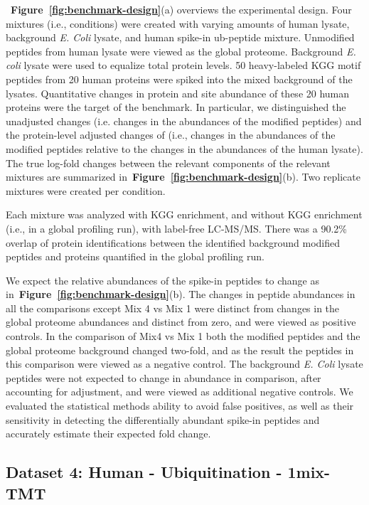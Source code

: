 \documentclass[mcp]{article}
\numberwithin{table}{section}
\def\figref#1{{\bf Figure~\ref{fig:#1}}}
\begin{document}
\medskip {}~\figref{benchmark-design}(a) overviews the experimental design. Four mixtures (i.e., conditions) were created with varying amounts of human lysate, background {\it E. Coli} lysate, and human spike-in ub-peptide mixture. Unmodified peptides from human lysate were viewed as the global proteome. Background {\it E. coli} lysate were used to equalize total protein levels.   50 heavy-labeled KGG motif peptides from 20 human proteins were spiked into the mixed background of the lysates. Quantitative changes in protein and site abundance of these 20 human proteins were the target of the benchmark. In particular, we distinguished the unadjusted changes (i.e. changes in the abundances of the modified peptides) and the protein-level adjusted changes of (i.e., changes in the abundances of the modified peptides relative to the changes in the abundances of the human lysate). The true log-fold changes between the relevant components of the relevant mixtures are summarized in~\figref{benchmark-design}(b).  Two replicate mixtures were created per condition. 

\medskip {} Each mixture was analyzed with KGG enrichment, and without KGG enrichment (i.e., in a global profiling run), with label-free LC-MS/MS. There was a 90.2\% overlap of protein identifications between the identified background modified peptides and proteins quantified in the global profiling run.

\medskip {} We expect the relative abundances of the spike-in peptides to change as in~\figref{benchmark-design}(b). The changes in peptide abundances in all the comparisons except Mix 4 vs Mix 1 were distinct from changes in the global proteome abundances and distinct from zero, and were viewed as positive controls. In the comparison of Mix4 vs Mix 1 both the modified peptides and the global proteome background changed two-fold, and as the result the peptides in this comparison were viewed as a negative control. The background {\it E. Coli} lysate peptides were not expected to change in abundance in comparison, after accounting for adjustment, and were viewed as additional negative controls. We evaluated the statistical methods ability to avoid false positives, as well as their sensitivity in detecting the differentially abundant spike-in peptides and accurately estimate their expected fold change.


\subsection*{Dataset 4: Human - Ubiquitination - 1mix-TMT}
\label{sec:exp_proc_dataset4}
\end{document}
